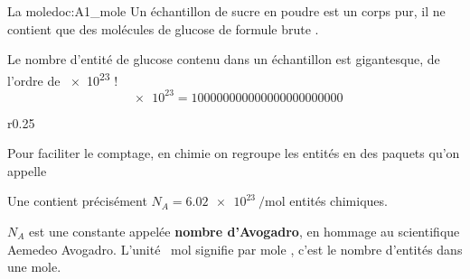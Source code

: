 

\begin{doc}{La mole}{doc:A1_mole}
  Un échantillon de sucre en poudre est un corps pur, il ne contient que des molécules de glucose de formule brute .

  Le nombre d'entité de glucose contenu dans un échantillon est gigantesque, de l'ordre de \num{e23} !
  \begin{equation*}
    \num{e23} = \num{100 000 000 000 000 000 000 000}
  \end{equation*}

  \begin{wrapfigure}{r}{0.25\linewidth}
    \centering \vspace*{-50pt}
     \\[4pt]
  \end{wrapfigure}
  Pour faciliter le comptage, en chimie on regroupe les entités en des paquets qu'on appelle 
  \begin{encart}
    Une  contient précisément $N_A = \qty{6,02 e23}{\per\mole}$ entités chimiques.
  \end{encart}
  \attention $N_A$ est une constante appelée \textbf{nombre d'Avogadro}, en hommage au scientifique Aemedeo Avogadro.
  L'unité \og \unit{\per\mole} \fg\! signifie \og par mole \fg, c’est le nombre d'entités dans une mole.
\end{doc}


